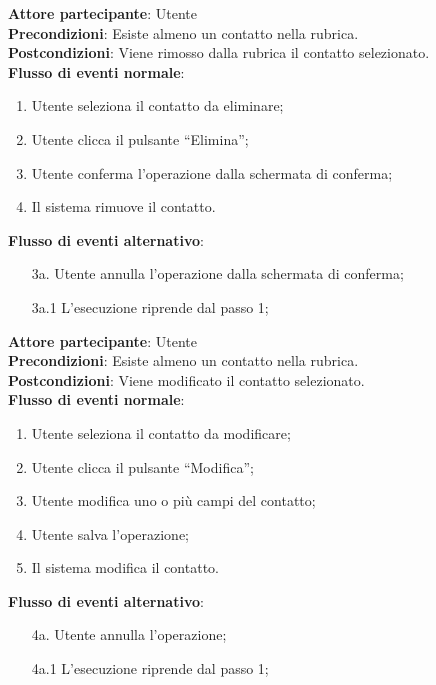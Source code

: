 \begin{tcolorbox}[colback=white,colframe=black!80!white,title=\textbf{C1 - Eliminare contatto}]
	\textbf{Attore partecipante}: Utente
	\\\textbf{Precondizioni}: Esiste almeno un contatto nella rubrica.
	\\\textbf{Postcondizioni}: Viene rimosso dalla rubrica il contatto selezionato.
	\\\textbf{Flusso di eventi normale}:
	\begin{enumerate}[noitemsep, topsep=0pt]
\item	Utente seleziona il contatto da eliminare;
\item	Utente clicca il pulsante “Elimina”;
\item	Utente conferma l’operazione dalla schermata di conferma;
\item	Il sistema rimuove il contatto.
	\end{enumerate}
	\textbf{Flusso di eventi alternativo}:
	\begin{itemize}[noitemsep, topsep=0pt]
		\item[3a. ] Utente annulla l’operazione dalla schermata di conferma;
		\item[3a.1] L’esecuzione riprende dal passo 1;
	\end{itemize}
\end{tcolorbox}

\begin{tcolorbox}[colback=white,colframe=black!80!white,title=\textbf{C2 - Modificare contatto}]
	\textbf{Attore partecipante}: Utente
	\\\textbf{Precondizioni}: Esiste almeno un contatto nella rubrica.
	\\\textbf{Postcondizioni}: Viene modificato il contatto selezionato.
	\\\textbf{Flusso di eventi normale}:
	\begin{enumerate}[noitemsep, topsep=0pt]
\item Utente seleziona il contatto da modificare;
\item Utente clicca il pulsante “Modifica”; 
\item Utente modifica uno o più campi del contatto;
\item Utente salva l’operazione;
\item Il sistema modifica il contatto.		
	\end{enumerate}
	\textbf{Flusso di eventi alternativo}:
	\begin{itemize}[noitemsep, topsep=0pt]
		\item[4a. ] Utente annulla l’operazione;
		\item[4a.1] L’esecuzione riprende dal passo 1;
	\end{itemize}
\end{tcolorbox}

